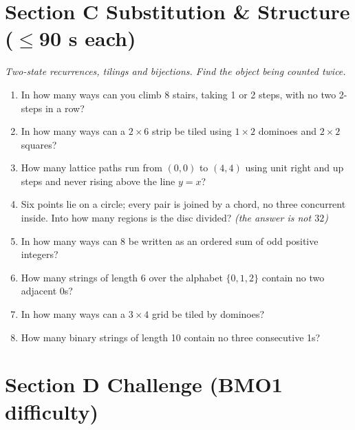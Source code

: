 \documentclass[11pt,a4paper]{article}
\begin{document}
\section*{Section C \quad Substitution \& Structure \hfill{\normalfont\small($\leq$90 s each)}}

\noindent\textit{Two-state recurrences, tilings and bijections. Find the object being counted twice.}

\begin{enumerate}

\item In how many ways can you climb 8 stairs, taking 1 or 2 steps, with no two 2-steps in a row?

\item In how many ways can a $2\times6$ strip be tiled using $1\times2$ dominoes and $2\times2$ squares?

\item How many lattice paths run from $(0,0)$ to $(4,4)$ using unit right and up steps and never rising above the line $y=x$?

\item Six points lie on a circle; every pair is joined by a chord, no three concurrent inside. Into how many regions is the disc divided? \textit{\small(the answer is not $32$)}

\item In how many ways can 8 be written as an ordered sum of odd positive integers?

\item How many strings of length 6 over the alphabet $\{0,1,2\}$ contain no two adjacent 0s?

\item In how many ways can a $3\times4$ grid be tiled by dominoes?

\item How many binary strings of length 10 contain no three consecutive 1s?

\end{enumerate}

\section*{Section D \quad Challenge \hfill{\normalfont\small(BMO1 difficulty)}}
\end{document}
